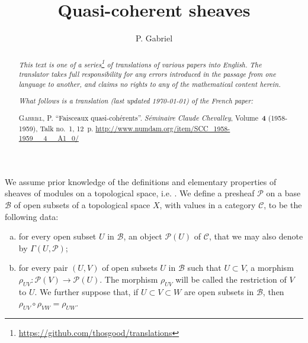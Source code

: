 \documentclass{article}
\theoremstyle{plain}
\newcommand{\sh}{\mathscr}
\newcommand{\cat}{\mathcal}
\newcommand{\oldpage}[1]{\marginpar{\footnotesize$\Big\vert$ \textit{p.~#1}}}
\begin{document}
\renewcommand{\abstractname}{Translator's note.}

\title{Quasi-coherent sheaves}
\author{P. Gabriel}
\date{}
\maketitle

\begin{abstract}
  \renewcommand*{\thefootnote}{\fnsymbol{footnote}}
  \emph{This text is one of a series\footnote{\url{https://github.com/thosgood/translations}} of translations of various papers into English.}
  \emph{The translator takes full responsibility for any errors introduced in the passage from one language to another, and claims no rights to any of the mathematical content herein.}
  
  \emph{What follows is a translation (last updated \today) of the French paper:}

  \medskip\noindent
  \textsc{Gabriel, P.}
  ``Faisceaux quasi-coh\'{e}rents''.
  \emph{S\'{e}minaire Claude Chevalley}, Volume~\textbf{4} (1958-1959), Talk no.~1, 12~p.
  {\footnotesize\url{http://www.numdam.org/item/SCC_1958-1959__4__A1_0/}}
\end{abstract}

\setcounter{footnote}{0}

\tableofcontents



\bigskip\bigskip
\oldpage{1-01}
We assume prior knowledge of the definitions and elementary properties of sheaves of modules on a topological space, i.e. \cite[chapitre~I, \S1; chapitre~II, \S\S1--2]{2}.
We define a presheaf $\sh{P}$ on a base $\mathscr{B}$ of open subsets of a topological space $X$, with values in a category $\cat{C}$, to be the following data:
\begin{enumerate}[(a)]
  \item for every open subset $U$ in $\mathscr{B}$, an object $\sh{P}(U)$ of $\cat{C}$, that we may also denote by $\Gamma(U,\sh{P})$;
  \item for every pair $(U,V)$ of open subsets $U$ in $\mathscr{B}$ such that $U\subset V$, a morphism $\rho_{UV}\colon\sh{P}(V)\to\sh{P}(U)$.
    The morphism $\rho_{UV}$ will be called the restriction of $V$ to $U$.
    We further suppose that, if $U\subset V\subset W$ are open subsets in $\mathscr{B}$, then $\rho_{UV}\circ\rho_{VW}=\rho_{UW}$.
\end{enumerate}
\end{document}
